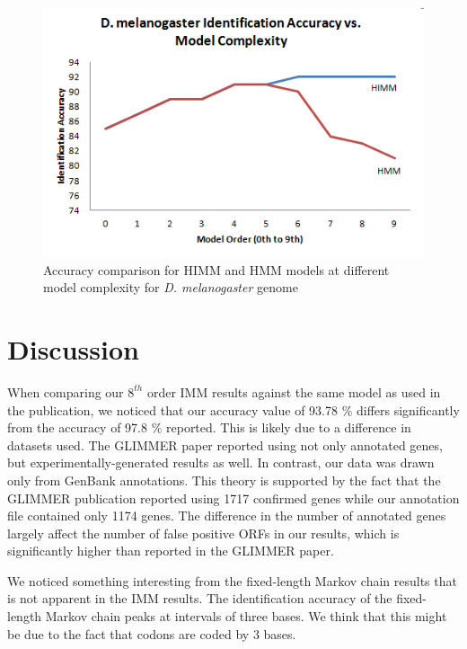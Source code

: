 \documentclass[11pt,letterpaper]{article}
\begin{document}
\begin{figure}
	\begin{center}
		\includegraphics[scale=0.8]{plots/accuracy_vs_model_complexity_drosophila_hmm.png}
	\end{center}
	\caption{\label{font-table} Accuracy comparison for HIMM and HMM models at different model complexity for \emph{D. melanogaster} genome}
\end{figure}



\section{Discussion}

When comparing our $8^{th}$ order IMM results against the same model as used in the publication, we noticed that our accuracy value of 93.78 \% differs significantly from the accuracy of 97.8 \% reported. This is likely due to a difference in datasets used. The GLIMMER paper reported using not only annotated genes, but experimentally-generated results as well. In contrast, our data was drawn only from GenBank annotations. This theory is supported by the fact that the GLIMMER publication reported using 1717 confirmed genes while our annotation file contained only 1174 genes. The difference in the number of annotated genes largely affect the number of false positive ORFs in our results, which is significantly higher than reported in the GLIMMER paper.

We noticed something interesting from the fixed-length Markov chain results that is not apparent in the IMM results. The identification accuracy of the fixed-length Markov chain peaks at intervals of three bases. We think that this might be due to the fact that codons are coded by 3 bases. 
\end{document}
